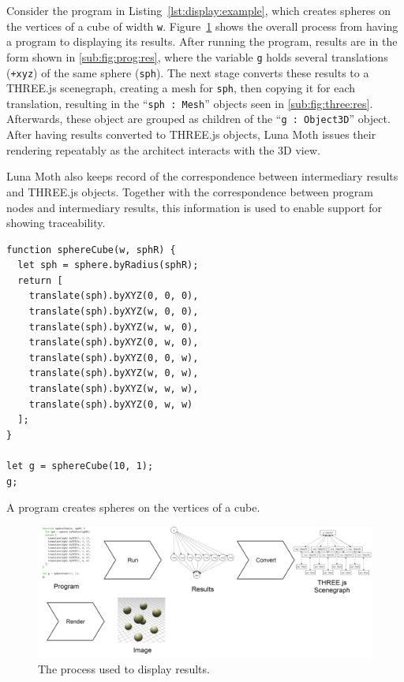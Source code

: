 Consider the program in Listing~\ref{lst:display:example}, which creates spheres on the vertices of a cube of width {\tt w}.
Figure~\ref{fig:display:results} shows the overall process from having a program to displaying its results.
After running the program, results are in the form shown in \ref{sub:fig:prog:res}, where the variable {\tt g} holds several translations ({\tt +xyz}) of the same sphere ({\tt sph}).
The next stage converts these results to a THREE.js scenegraph, creating a mesh for {\tt sph}, then copying it for each translation, resulting in the ``{\tt sph~:~Mesh}'' objects seen in \ref{sub:fig:three:res}. Afterwards, these object are grouped as children of the ``{\tt g : Object3D}'' object.
After having results converted to THREE.js objects, Luna Moth issues their rendering repeatably as the architect interacts with the 3D view.

Luna Moth also keeps record of the correspondence between intermediary results and THREE.js objects.
Together with the correspondence between program nodes and intermediary results, this information is used to enable support for showing traceability.


\begin{listing}
\begin{verbatim}
function sphereCube(w, sphR) {
  let sph = sphere.byRadius(sphR);
  return [
    translate(sph).byXYZ(0, 0, 0),
    translate(sph).byXYZ(w, 0, 0),
    translate(sph).byXYZ(w, w, 0),
    translate(sph).byXYZ(0, w, 0),
    translate(sph).byXYZ(0, 0, w),
    translate(sph).byXYZ(w, 0, w),
    translate(sph).byXYZ(w, w, w),
    translate(sph).byXYZ(0, w, w)
  ];
}

let g = sphereCube(10, 1);
g;
\end{verbatim}
\caption{A program creates spheres on the vertices of a cube.}
\label{lst:display:example}
\end{listing}


\begin{figure}
  \centering
  \includegraphics[width=1.0\textwidth]{./images/display_results/display_results}
  \caption{The process used to display results.}
  \label{fig:display:results}
\end{figure}

